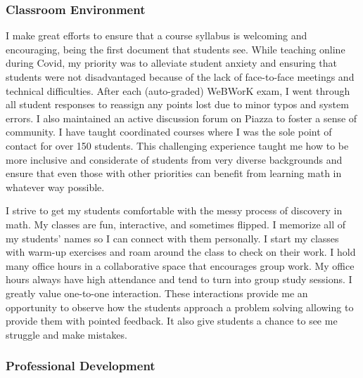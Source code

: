 \documentclass[
]{report}
\begin{document}
\hypertarget{classroom-environment}{%
\subsubsection*{Classroom Environment}\label{classroom-environment}}


I make great efforts to ensure that a course syllabus is welcoming and encouraging, being the first document that students see.
While teaching online during Covid, my priority was to alleviate student anxiety and ensuring that students were not disadvantaged because of the lack of face-to-face meetings and technical difficulties. After each (auto-graded) WeBWorK exam, I went through all student responses to reassign any points lost due to minor typos and system errors. I also maintained an active discussion forum on Piazza to foster a sense of community. I have taught coordinated courses where I was the sole point of contact for over 150 students. This challenging experience taught me how to be more inclusive and considerate of students from very diverse backgrounds and ensure that even those with other priorities can benefit from learning math in whatever way possible.

I strive to get my students comfortable with the messy process of discovery in math.
My classes are fun, interactive, and sometimes flipped.
I memorize all of my students' names so I can connect with them personally.
I start my classes with warm-up exercises and roam around the class to check on their work.
I hold many office hours in a collaborative space that encourages group work. My office hours always have high attendance and tend to turn into group study sessions.
I greatly value one-to-one interaction.
These interactions provide me an opportunity to observe how the students approach a problem solving allowing to provide them with pointed feedback.
It also give students a chance to see me struggle and make mistakes.

\hypertarget{professional-development}{%
\subsubsection*{Professional Development}\label{professional-development}}
\end{document}
